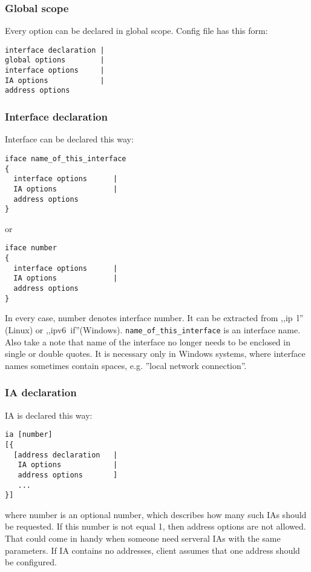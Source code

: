 \subsubsection{Global scope}

Every option can be declared in global scope.
Config file has this form:

\begin{verbatim}
interface declaration | 
global options        | 
interface options     |
IA options            |
address options
\end{verbatim}

\subsubsection{Interface declaration}

Interface can be declared this way:
\begin{verbatim}
iface name_of_this_interface
{
  interface options      |
  IA options             |
  address options        
}
\end{verbatim}

or 

\begin{verbatim}
iface number 
{
  interface options      |
  IA options             |
  address options        
}
\end{verbatim}

In every case, number denotes interface number. It can be extracted
from ,,ip~l'' (Linux) or
,,ipv6~if''(Windows). \verb+name_of_this_interface+ is an interface
name.  Also take a note that name of the interface
no longer needs to be enclosed in single or double quotes. It is
necessary only in Windows systems, where interface names sometimes
contain spaces, e.g. ''local network connection''.

\subsubsection{IA declaration}

IA is declared this way:

\begin{verbatim}
ia [number]
[{ 
  [address declaration   | 
   IA options            | 
   address options       ] 
   ...          
}]
\end{verbatim}

where number is an optional number, which describes how many such IAs
should be requested. If this number is not equal 1, then address
options are not allowed. That could come in handy when someone need
serveral IAs with the same parameters. If IA contains no addresses,
client assumes that one address should be configured.


